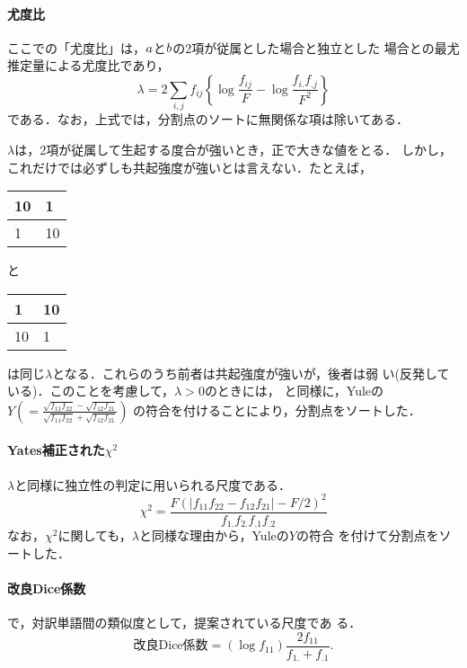 \paragraph{尤度比}

ここでの「尤度比」は，$a $と$ b$の2項が従属とした場合と独立とした
場合との最尤推定量による尤度比であり，
\begin{equation}
  \label{eq:lambda}
  \lambda = 2 \sum_{i,j} f_{ij}\left \{\log\frac{f_{ij}}{F} - \log\frac{f_{i.}f_{.j}}{F^2} \right \}
\end{equation}
である．なお，上式では，分割点のソートに無関係な項は除いてある．

$\lambda$は，2項が従属して生起する度合が強いとき，正で大きな値をとる．
しかし，これだけでは必ずしも共起強度が強いとは言えない．たとえば，
\begin{tabular}{|l|l|}
  \hline
  10 & 1   \\
  \hline
  1  & 10  \\
  \hline
\end{tabular}
と
\begin{tabular}{|l|l|}
  \hline
  1  & 10   \\
  \hline
  10  & 1  \\
  \hline
\end{tabular}
は同じ$\lambda$となる．これらのうち前者は共起強度が強いが，後者は弱
い(反発している)．このことを考慮して，$\lambda>0$のときには，
\cite{kageura97}と同様に，Yuleの
$Y (=\frac{\sqrt{f_{11}f_{22}}-\sqrt{f_{12}f_{21}}}{\sqrt{f_{11}f_{22}}+\sqrt{f_{12}f_{21}}})$
の符合を付けることにより，分割点をソートした．

\paragraph{Yates補正された$\chi^2$}

$\lambda$と同様に独立性の判定に用いられる尺度である．
\begin{equation}
  \label{eq:chi2}
  \chi^2 = \frac{F(|f_{11}f_{22}-f_{12}f_{21}|-F/2)^2}{f_{1.}f_{2.}f_{.1}f_{.2}}
\end{equation}
なお，$\chi^2$に関しても，$\lambda$と同様な理由から，Yuleの$Y$の符合
を付けて分割点をソートした．

\paragraph{改良Dice係数}

\cite{kitamura97}で，対訳単語間の類似度として，提案されている尺度であ
る．
\begin{equation}
  \label{eq:dice}
  \mbox{改良Dice係数} = (\log f_{11})\frac{2f_{11}}{f_{1.}+f_{.1}}.
\end{equation}

